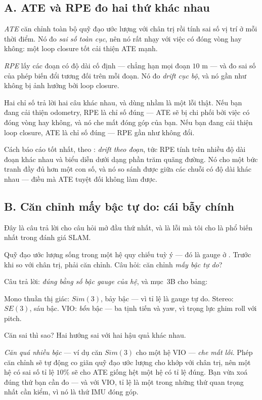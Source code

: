\documentclass[../../vslam.tex]{subfiles}
\begin{document}
\subsection{A. ATE và RPE đo hai thứ khác nhau}

\emph{ATE} căn chỉnh toàn bộ quỹ đạo ước lượng với chân trị rồi tính sai số vị trí ở mỗi thời điểm. Nó đo \emph{sai số toàn cục}, nên nó rất nhạy với việc có đóng vòng hay không: một loop closure tốt cải thiện ATE mạnh.

\emph{RPE} lấy các đoạn có độ dài cố định --- chẳng hạn mọi đoạn \(10\) m --- và đo sai số của phép biến đổi tương đối trên mỗi đoạn. Nó đo \emph{drift cục bộ}, và nó gần như không bị ảnh hưởng bởi loop closure.

Hai chỉ số trả lời hai câu khác nhau, và dùng nhầm là một lỗi thật. Nếu bạn đang cải thiện odometry, RPE là chỉ số đúng --- ATE sẽ bị chi phối bởi việc có đóng vòng hay không, và nó che mất đóng góp của bạn. Nếu bạn đang cải thiện loop closure, ATE là chỉ số đúng --- RPE gần như không đổi.

Cách báo cáo tốt nhất, theo \cite{zhang2018trajeval}: \emph{drift theo đoạn}, tức RPE tính trên nhiều độ dài đoạn khác nhau và biểu diễn dưới dạng phần trăm quãng đường. Nó cho một bức tranh đầy đủ hơn một con số, và nó so sánh được giữa các chuỗi có độ dài khác nhau --- điều mà ATE tuyệt đối không làm được.

\subsection{B. Căn chỉnh mấy bậc tự do: cái bẫy chính}

Đây là câu trả lời cho câu hỏi mở đầu thứ nhất, và là lỗi mà tôi cho là phổ biến nhất trong đánh giá SLAM.

Quỹ đạo ước lượng sống trong một hệ quy chiếu tuỳ ý --- đó là gauge ở . Trước khi so với chân trị, phải căn chỉnh. Câu hỏi: căn chỉnh \emph{mấy bậc tự do}?

Câu trả lời: \emph{đúng bằng số bậc gauge của hệ}, và  mục~3B cho bảng:

Mono thuần thị giác: \(Sim(3)\), bảy bậc --- vì tỉ lệ là gauge tự do. Stereo: \(SE(3)\), sáu bậc. VIO: \emph{bốn} bậc --- ba tịnh tiến và yaw, vì trọng lực ghim roll với pitch.

Căn sai thì sao? Hai hướng sai với hai hậu quả khác nhau.

\emph{Căn quá nhiều bậc} --- ví dụ căn \(Sim(3)\) cho một hệ VIO --- \emph{che mất lỗi}. Phép căn chỉnh sẽ tự động co giãn quỹ đạo ước lượng cho khớp với chân trị, nên một hệ có sai số tỉ lệ \(10\%\) sẽ cho ATE giống hệt một hệ có tỉ lệ đúng. Bạn vừa xoá đúng thứ bạn cần đo --- và với VIO, tỉ lệ là một trong những thứ quan trọng nhất cần kiểm, vì nó là thứ IMU đóng góp.
\end{document}
